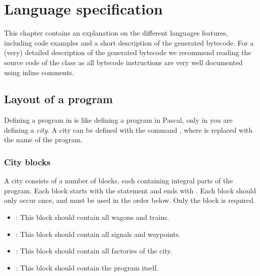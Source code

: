 \chapter{Language specification}

This chapter contains an explanation on the different languages features, including code examples and a short description of the generated bytecode. For a (very) detailed description of the generated bytecode we recommend reading the source code of the  class as all bytecode instructions are very well documented using inline comments.

\section{Layout of a program}

Defining a program in \shortname is like defining a program in Pascal, only in \shortname you are defining a \emph{city}. A city can be defined with the command , where  is replaced with the name of the program.

\subsection{City blocks}

A city consists of a number of blocks, each containing integral parts of the program. Each block starts with the statement  and ends with . Each block should only occur once, and must be used in the order below. Only the  block is required.

\begin{itemize}
\item {}: This block should contain all wagons and trains.
\item {}: This block should contain all signals and waypoints.
\item {}: This block should contain all factories of the city.
\item {}: This block should contain the program itself.
\end{itemize}

